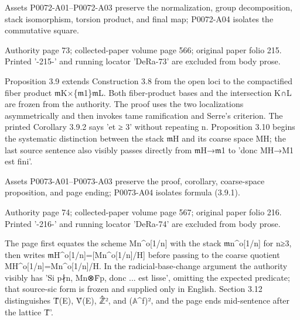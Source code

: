\documentclass[11pt,a4paper]{article}
\begin{document}
Assets P0072-A01--P0072-A03 preserve the normalization, group decomposition, stack isomorphism, torsion product, and final map; P0072-A04 isolates the commutative square.


\par\medskip
\hypertarget{D018-P0073}{}
\par\smallskip
Authority page 73; collected-paper volume page 566; original paper folio 215. Printed '-215-' and running locator 'DeRa-73' are excluded from body prose.

Proposition 3.9 extends Construction 3.8 from the open loci to the compactified fiber product \ensuremath{\mathfrak{m}}\textunderscore{}K×\textunderscore{}\{\ensuremath{\mathfrak{m}}\textunderscore{}1\}\ensuremath{\mathfrak{m}}\textunderscore{}L. Both fiber-product bases and the intersection K∩L are frozen from the authority. The proof uses the two localizations asymmetrically and then invokes tame ramification and Serre's criterion. The printed Corollary 3.9.2 says 'et ≥ 3' without repeating n. Proposition 3.10 begins the systematic distinction between the stack \ensuremath{\mathfrak{m}}\textunderscore{}H and its coarse space M\textunderscore{}H; the last source sentence also visibly passes directly from \ensuremath{\mathfrak{m}}\textunderscore{}H→\ensuremath{\mathfrak{m}}\textunderscore{}1 to 'donc M\textunderscore{}H→M\textunderscore{}1 est fini'.

Assets P0073-A01--P0073-A03 preserve the proof, corollary, coarse-space proposition, and page ending; P0073-A04 isolates formula (3.9.1).


\par\medskip
\hypertarget{D018-P0074}{}
\par\smallskip
Authority page 74; collected-paper volume page 567; original paper folio 216. Printed '-216-' and running locator 'DeRa-74' are excluded from body prose.

The page first equates the scheme M\textunderscore{}n\textasciicircum{}o[1/n] with the stack \ensuremath{\mathfrak{m}}\textunderscore{}n\textasciicircum{}o[1/n] for n≥3, then writes \ensuremath{\mathfrak{m}}\textunderscore{}H\textasciicircum{}o[1/n]=[M\textunderscore{}n\textasciicircum{}o[1/n]/H] before passing to the coarse quotient M\textunderscore{}H\textasciicircum{}o[1/n]=M\textunderscore{}n\textasciicircum{}o[1/n]/H. In the radicial-base-change argument the authority visibly has 'Si p∤n, M\textunderscore{}n⊗F̄\textunderscore{}p, donc ... est lisse', omitting the expected predicate; that source-sic form is frozen and supplied only in English. Section 3.12 distinguishes T̂(E), V̂(E), ℤ̂², and (\ensuremath{\mathbb{A}}\textasciicircum{}f)², and the page ends mid-sentence after the lattice T̂'.
\end{document}
